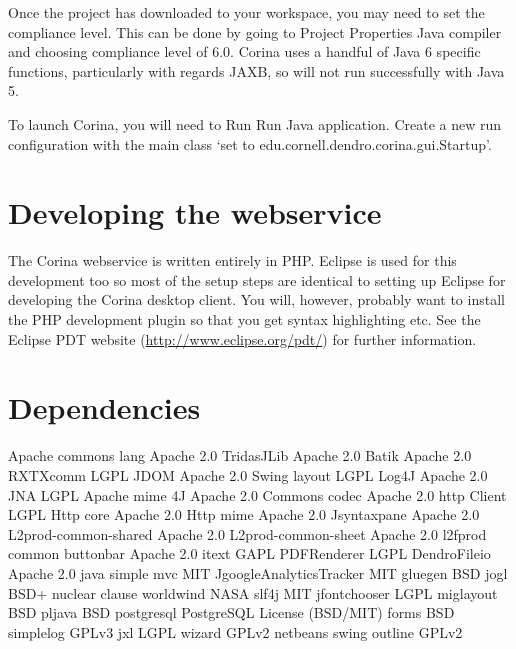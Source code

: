 Once the project has downloaded to your workspace, you may need to set the compliance level.  This can be done by going to Project \MVRightarrow Properties \MVRightarrow Java compiler and choosing compliance level of 6.0.  Corina uses a handful of Java 6 specific functions, particularly with regards JAXB, so will not run successfully with Java 5.

To launch Corina, you will need to Run \MVRightarrow Run \MVRightarrow Java application.  Create a new run configuration with the main class `set to edu.cornell.dendro.corina.gui.Startup'.     


\section{Developing the webservice}

The Corina webservice is written entirely in PHP.  Eclipse is used for this development too so most of the setup steps are identical to setting up Eclipse for developing the Corina desktop client.  You will, however, probably want to install the PHP development plugin so that you get syntax highlighting etc.  See the Eclipse PDT website (\url{http://www.eclipse.org/pdt/}) for further information.



\section{Dependencies}

Apache commons lang	Apache 2.0
TridasJLib	Apache 2.0
Batik	Apache 2.0
RXTXcomm	LGPL
JDOM	Apache 2.0
Swing layout	LGPL
Log4J	Apache 2.0
JNA	LGPL
Apache mime 4J	Apache 2.0
Commons codec	Apache 2.0
http Client	LGPL
Http core	Apache 2.0
Http mime	Apache 2.0
Jsyntaxpane	Apache 2.0
L2prod-common-shared	Apache 2.0
L2prod-common-sheet	Apache 2.0
l2fprod common buttonbar	Apache 2.0
itext	GAPL
PDFRenderer	LGPL
DendroFileio	Apache 2.0
java simple mvc	MIT
JgoogleAnalyticsTracker	MIT
gluegen	BSD
jogl	BSD+ nuclear clause
worldwind	NASA 
slf4j	MIT
jfontchooser	LGPL
miglayout	BSD
pljava	BSD
postgresql	PostgreSQL License (BSD/MIT)
forms	BSD
simplelog	GPLv3
jxl	LGPL
wizard	GPLv2
netbeans swing outline	GPLv2

